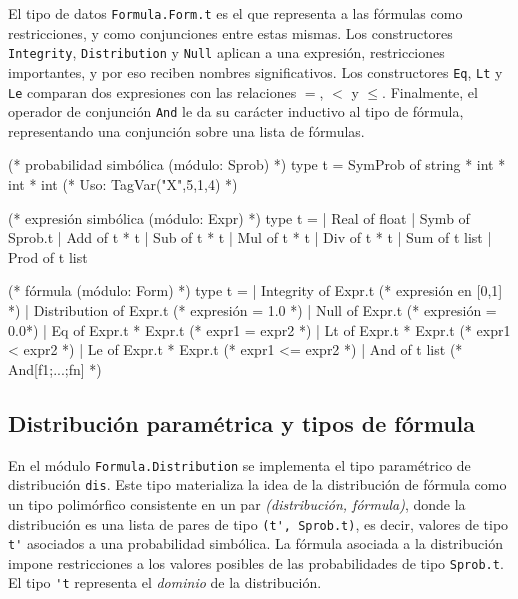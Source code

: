 El tipo de datos \verb|Formula.Form.t| es el que representa a las fórmulas como
restricciones, y como conjunciones entre estas mismas.  Los constructores
\verb|Integrity|, \verb|Distribution| y \verb|Null| aplican a una expresión,
restricciones importantes, y por eso reciben nombres significativos. Los
constructores \verb|Eq|, \verb|Lt| y \verb|Le| comparan dos expresiones con
las relaciones $=$, $<$ y $\leq$. Finalmente, el operador de conjunción
\verb|And| le da su carácter inductivo al tipo de fórmula, representando una
conjunción sobre una lista de fórmulas.



\begin{ocamlblock}[caption={Fórmulas y sus componentes},label={lst:formula}]
  (* probabilidad simbólica (módulo: Sprob) *)
  type t = SymProb of string * int * int * int (* Uso: TagVar("X",5,1,4) *)

  (* expresión simbólica (módulo: Expr) *)
  type t =
  | Real  of float  | Symb  of Sprob.t
  | Add   of t * t  | Sub   of t * t
  | Mul   of t * t  | Div   of t * t
  | Sum   of t list | Prod  of t list

  (* fórmula (módulo: Form) *)
  type t = 
  | Integrity    of Expr.t (* expresión en [0,1] *)
  | Distribution of Expr.t (* expresión = 1.0 *)
  | Null         of Expr.t (* expresión = 0.0*)
  | Eq           of Expr.t * Expr.t (* expr1 = expr2 *)
  | Lt           of Expr.t * Expr.t (* expr1 < expr2 *)
  | Le           of Expr.t * Expr.t (* expr1 <= expr2 *)
  | And          of t list (* And[f1;...;fn] *)
\end{ocamlblock}





\subsection{Distribución paramétrica y tipos de fórmula}
En el módulo \verb|Formula.Distribution| se implementa el tipo
paramétrico de distribución \verb|dis|. Este tipo materializa la idea
de la distribución de fórmula como un tipo polimórfico consistente en
un par \emph{(distribución, fórmula)}, donde la distribución es una
lista de pares de tipo \verb|(t', Sprob.t)|, es decir, valores de tipo
\verb|t'| asociados a una probabilidad simbólica. La fórmula asociada
a la distribución impone restricciones a los valores posibles de las
probabilidades de tipo \verb|Sprob.t|. El tipo \verb|'t| representa el
\emph{dominio} de la distribución.

